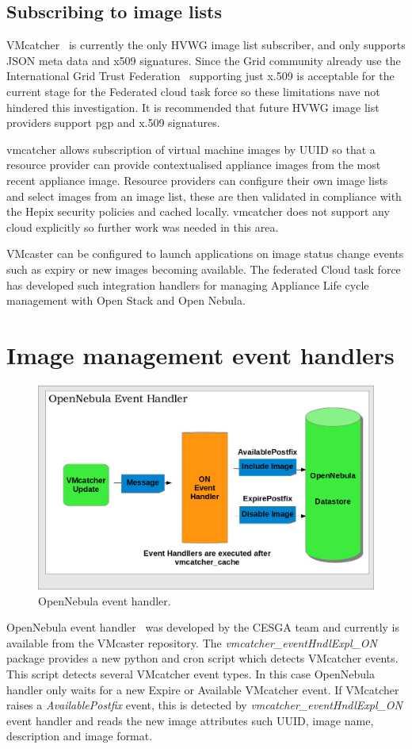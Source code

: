 \documentclass{llncs_Ibergrid2013}
\begin{document}
\subsection{Subscribing to image lists}
VMcatcher~\cite{vmcatcher} is currently the only HVWG image list subscriber, and only supports JSON meta data and x509 signatures. Since the Grid community already use the International Grid Trust Federation~\cite{igtf} supporting just x.509 is acceptable for the current stage for the Federated cloud task force so these limitations nave not hindered this investigation. It is recommended that future HVWG image list providers support pgp and x.509 signatures.

vmcatcher allows subscription of virtual machine images by UUID so that a resource provider can provide contextualised appliance images from the most recent appliance image. Resource providers can configure their own image lists and select images from an image list, these are then validated in compliance with the Hepix security policies and cached locally. vmcatcher does not support any cloud explicitly so further work was needed in this area.

VMcaster can be configured to launch applications on image status change events such as expiry or new images becoming available. The federated Cloud task force has developed such integration handlers for managing Appliance Life cycle management with Open Stack and Open Nebula.
\section{Image management event handlers}
\label{sect-handlers}
\begin{figure}[h]
\centering
\includegraphics[width=1\textwidth]{ONeventhandler.png}
\caption{OpenNebula event handler.}
\label{fig:onevent}
\end{figure}
OpenNebula event handler~\cite{onevent} was developed by the CESGA team and currently is available from the VMcaster repository. 
The \textit{vmcatcher\_eventHndlExpl\_ON} package provides a new python and cron script which detects VMcatcher events. 
This script detects several VMcatcher event types. In this case OpenNebula handler only waits for a new Expire or Available VMcatcher event.
If VMcatcher raises a \textit{AvailablePostfix} event, this is detected by \textit{vmcatcher\_eventHndlExpl\_ON} event handler and reads the new image attributes such UUID, image name, description and image format.
\end{document}
